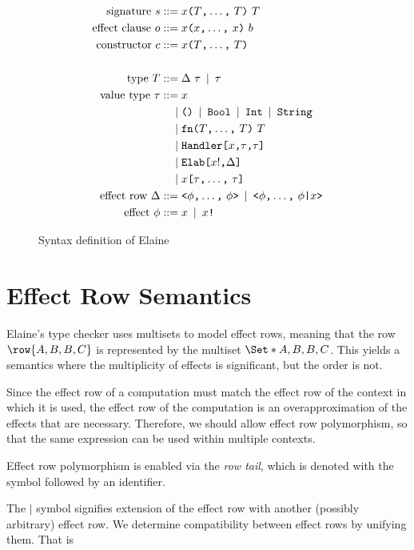 \begin{figure}[p]
\begin{align*}
    \text{signature}\ s
        \mathbin{\;::=\;} & x \text{\texttt{(}} T\text{\texttt{,}} \dots \text{\texttt{,}}\ T \text{\texttt{)}}\ T\\
    \text{effect clause}\ o
        \mathbin{\;::=\;} & x \text{\texttt{(}} x\text{\texttt{,}} \dots \text{\texttt{,}}\ x \text{\texttt{)}}\ b\\
    \text{constructor}\ c
        \mathbin{\;::=\;} & x \text{\texttt{(}} T\text{\texttt{,}} \dots \text{\texttt{,}}\ T \text{\texttt{)}}\\
    \\
    \text{type}\ T
        \mathbin{\;::=\;} & \Delta\ \tau \mathbin{\;|\;} \tau\\
    \text{value type}\ \tau
        \mathbin{\;::=\;} & x \\ 
        \mathbin{\;|\;} & \text{\texttt{()}} \mathbin{\;|\;} \text{\texttt{Bool}} \mathbin{\;|\;} \text{\texttt{Int}} \mathbin{\;|\;} \text{\texttt{String}}\\
        \mathbin{\;|\;} & \text{\texttt{fn}} \text{\texttt{(}} T\text{\texttt{,}} \dots \text{\texttt{,}}\ T \text{\texttt{)}}\ T \\
        \mathbin{\;|\;} & \text{\texttt{Handler}}\text{\texttt{[}}x\text{\texttt{,}}\tau\text{\texttt{,}}\tau\text{\texttt{]}} \\
        \mathbin{\;|\;} & \text{\texttt{Elab}}\text{\texttt{[}}x!\text{\texttt{,}}\Delta\text{\texttt{]}} \\
        \mathbin{\;|\;} & x\text{\texttt{[}}\tau\text{\texttt{,}} \dots \text{\texttt{,}}\ \tau\text{\texttt{]}} \\
    \text{effect row}\ \Delta
        \mathbin{\;::=\;} & \text{\texttt{<}} \phi\text{\texttt{,}} \dots \text{\texttt{,}}\ \phi \text{\texttt{>}}
        \mathbin{\;|\;} \text{\texttt{<}} \phi\text{\texttt{,}} \dots \text{\texttt{,}}\ \phi \text{\texttt{|}} x \text{\texttt{>}} \\
    \text{effect}\ \phi \mathbin{\;::=\;} & x \mathbin{\;|\;} x\text{\texttt{!}}
\end{align*}
\caption{Syntax definition of Elaine}
\label{fig:syntax}
\end{figure}

\section{Effect Row Semantics}\label{sec:effectrows}

Elaine's type checker uses multisets to model effect rows, meaning that the row $\row{A, B, B, C}$ is represented by the multiset $\S{A, B, B, C}$. This yields a semantics where the multiplicity of effects is significant, but the order is not.

Since the effect row of a computation must match the effect row of the context in which it is used, the effect row of the computation is an overapproximation of the effects that are necessary. Therefore, we should allow effect row polymorphism, so that the same expression can be used within multiple contexts.

Effect row polymorphism is enabled via the \emph{row tail}, which is denoted with the \el{|} symbol followed by an identifier.

The $|$ symbol signifies extension of the effect row with another (possibly arbitrary) effect row. We determine compatibility between effect rows by unifying them. That is

